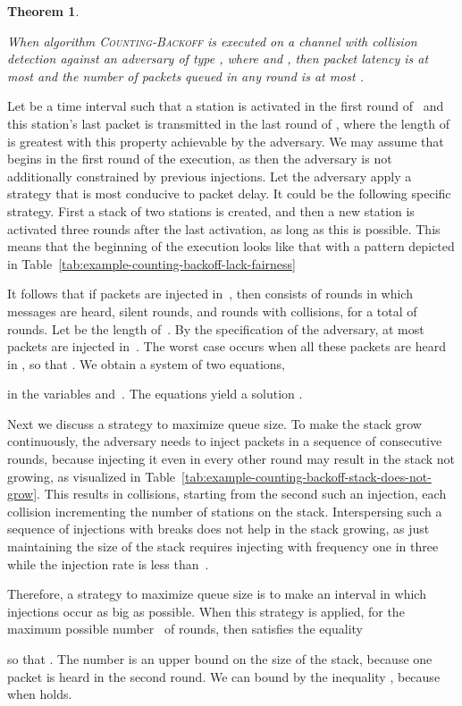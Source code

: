 \documentclass[11pt]{article}
\newcommand{\qed}{\hfill  \smallbreak}
\newenvironment{proof}{\noindent{\bf Proof:}}{\qed}
\newtheorem{theorem}{Theorem}
\begin{document}
\begin{theorem}
\label{thm:stack-with-collision-detection}

When algorithm \textsc{Counting-Backoff} is executed on a channel with collision detection against an adversary of type , where  and , then packet latency is at most  and the number of packets queued in any round is at most .
\end{theorem}

\begin{proof} 
Let  be a time interval such that a station is activated in the first round of~ and this station's last packet is transmitted in the last round of , where the length  of  is greatest with this property achievable by the adversary.
We may assume that  begins in the first round of the execution, as then the adversary is not additionally constrained by previous injections.
Let the adversary apply a strategy that is most conducive to packet delay.
It could be the following specific strategy.
First a stack of two stations is created, and then a new station is activated  three rounds after the last activation, as long as this is possible.
This means that the beginning of the execution looks like that with a pattern depicted in Table~\ref{tab:example-counting-backoff-lack-fairness}

It follows that if  packets are injected in~, then  consists of  rounds in which  messages are heard,  silent rounds, and  rounds with collisions, for a total of  rounds.
Let  be the length of~.
By the specification of the adversary, at most  packets are injected in~.
The worst case occurs when all these packets are heard in , so that .
We obtain a system of two equations, 

in the variables  and~.
The equations yield a solution .

Next we discuss a strategy to maximize queue size.
To make the stack grow continuously, the adversary needs to inject packets in a sequence of consecutive rounds, because injecting it even in every other round may result in the stack not growing, as visualized in Table~\ref{tab:example-counting-backoff-stack-does-not-grow}.
This results in collisions, starting from the second such an injection, each collision incrementing the number of stations on the stack.
Interspersing such a sequence of injections with breaks does not help in the stack growing, as just maintaining the size of the stack requires injecting with frequency one in three while the injection rate is less than~.

Therefore, a strategy to maximize queue size is to make an interval in which injections occur as big as possible.
When this strategy is applied, for the maximum possible number~ of rounds, then  satisfies the equality 

so that .
The number  is an upper bound on  the size of the stack, because one packet is heard in the second round.
We can bound  by the inequality , because  when   holds.
\end{proof} 
\end{document}
